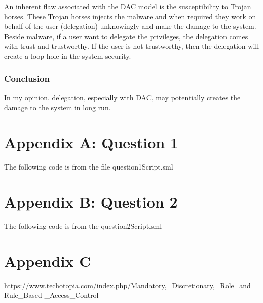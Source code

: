 \documentclass{report}
\begin{document}
An inherent flaw associated with the DAC model is the susceptibility
to Trojan horses. These Trojan horses injects the malware and when
required they work on behalf of the user (delegation) unknowingly and
make the damage to the system. Beside malware, if a user want to
delegate the privileges, the delegation comes with trust and
trustworthy. If the user is not trustworthy, then the delegation will
create a loop-hole in the system security.


\subsection{Conclusion}
\label{sec:conclusion-3}
In my opinion, delegation, especially with DAC, may potentially creates the damage to the system in long run.

\chapter{Appendix A: Question 1}
\label{cha:appendix-a:1}

The following code is from the file question1Script.sml


\chapter{Appendix B: Question 2 }
\label{cha:appendix-b:2}

The following code is from the question2Script.sml


\chapter{Appendix C}
\label{cha:appendix-c:3}
https://www.techotopia.com/index.php/Mandatory,_Discretionary,_Role_and_Rule_Based
_Access_Control
\end{document}
